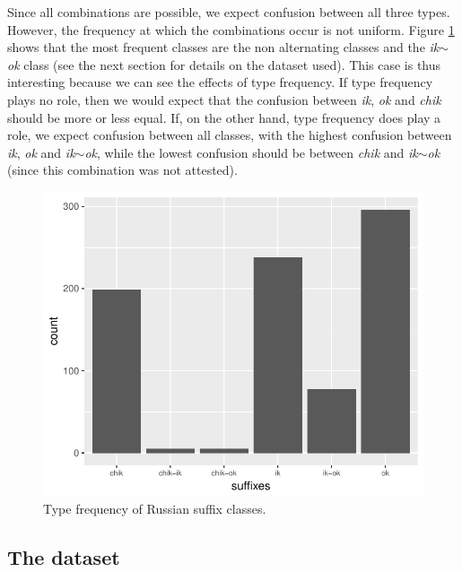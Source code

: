 Since all combinations are possible, we expect confusion between all three types. However, the frequency at which the combinations occur is not uniform. Figure \ref{fig:freqs-russ-dims} shows that the most frequent classes are the non alternating classes and the \textit{ik$\sim$ok} class (see the next section for details on the dataset used). This case is thus interesting because we can see the effects of type frequency. If type frequency plays no role, then we would expect that the confusion between \textit{ik}, \textit{ok} and \textit{chik} should be more or less equal. If, on the other hand, type frequency does play a role, we expect confusion between all classes, with the highest confusion between \textit{ik}, \textit{ok} and \textit{ik$\sim$ok}, while the lowest confusion should be between \textit{chik} and \textit{ik$\sim$ok} (since this combination was not attested).

\begin{figure}[!htpb]
  \centering
  \includegraphics[scale=0.7]{./figures/russian/suffixes}
  \caption{Type frequency of Russian suffix classes.}\label{fig:freqs-russ-dims}
\end{figure}

\subsection{The dataset}

